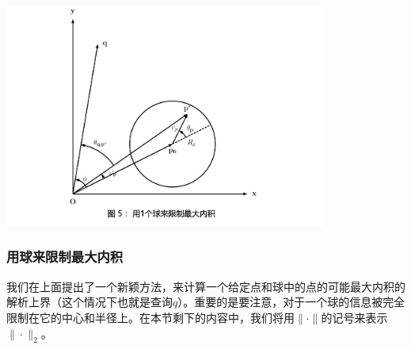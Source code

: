 \documentclass[twocolumn]{article}
\begin{document}
\includegraphics[width=300pt,clip,trim=45 0 0 0]{fig05.jpg}

\subsubsection{用球来限制最大内积}

我们在上面提出了一个新颖方法，来计算一个给定点和球中的点的可能最大内积的解析上界（这个情况下也就是查询$q$）。重要的是要注意，对于一个球的信息被完全限制在它的中心和半径上。在本节剩下的内容中，我们将用$\|\cdot\|$的记号来表示$\|\cdot\|_2$。
\end{document}
